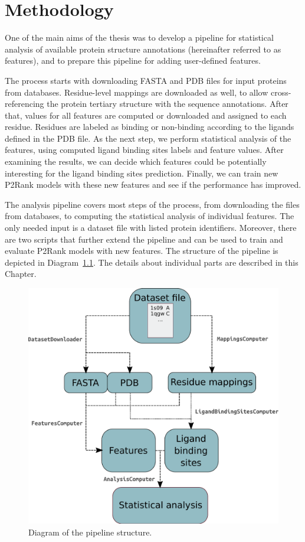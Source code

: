 
\chapter{Methodology}

One of the main aims of the thesis was to develop a pipeline for statistical analysis of available protein structure annotations (hereinafter referred to as features), and to prepare this pipeline for adding user-defined features.

The process starts with downloading FASTA and PDB files for input proteins from databases. Residue-level mappings are downloaded as well, to allow cross-referencing the protein tertiary structure with the sequence annotations. After that, values for all features are computed or downloaded and assigned to each residue. Residues are labeled as binding or non-binding according to the ligands defined in the PDB file. As the next step, we perform statistical analysis of the features, using computed ligand binding sites labels and feature values. After examining the results, we can decide which features could be potentially interesting for the ligand binding sites prediction. Finally, we can train new P2Rank models with these new features and see if the performance has improved.


The analysis pipeline covers most steps of the process, from downloading the files from databases, to computing the statistical analysis of individual features. The only needed input is a dataset file with listed protein identifiers. Moreover, there are two scripts that further extend the pipeline and can be used to train and evaluate P2Rank models with new features. The structure of the pipeline is depicted in Diagram~\ref{fig:diagram}. The details about individual parts are described in this Chapter.


\begin{figure}[!h]\centering
\includegraphics[width=140mm]{../img/pipelineDiagram.pdf}
\caption{Diagram of the pipeline structure.}
\label{fig:diagram}
\end{figure}

